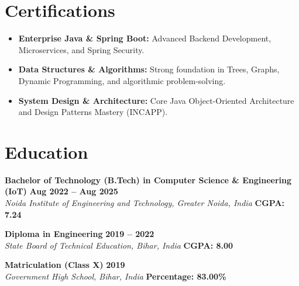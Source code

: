 \documentclass[letterpaper,10pt]{article}
\newcommand{\resumeItem}[1]{
  \item\small{
    {#1 \vspace{-2.0pt}}
  }
}
\begin{document}
\section{Certifications}
\begin{itemize}[leftmargin=0.2in, itemsep=1.5pt, topsep=2pt]
    \resumeItem{\textbf{Enterprise Java \& Spring Boot:} Advanced Backend Development, Microservices, and Spring Security.}
    \resumeItem{\textbf{Data Structures \& Algorithms:} Strong foundation in Trees, Graphs, Dynamic Programming, and algorithmic problem-solving.}
    \resumeItem{\textbf{System Design \& Architecture:} Core Java Object-Oriented Architecture and Design Patterns Mastery (INCAPP).}
\end{itemize}
\vspace{-6pt}

\section{Education}

\vspace{1pt}
\noindent \textbf{Bachelor of Technology (B.Tech) in Computer Science \& Engineering (IoT)} \hfill \textbf{Aug 2022 -- Aug 2025} \\
\textit{Noida Institute of Engineering and Technology, Greater Noida, India} \hfill \textbf{CGPA: 7.24} \\
\vspace{2pt}

\noindent \textbf{Diploma in Engineering} \hfill \textbf{2019 -- 2022} \\
\textit{State Board of Technical Education, Bihar, India} \hfill \textbf{CGPA: 8.00} \\
\vspace{2pt}

\noindent \textbf{Matriculation (Class X)} \hfill \textbf{2019} \\
\textit{Government High School, Bihar, India} \hfill \textbf{Percentage: 83.00\%}

\end{document}
